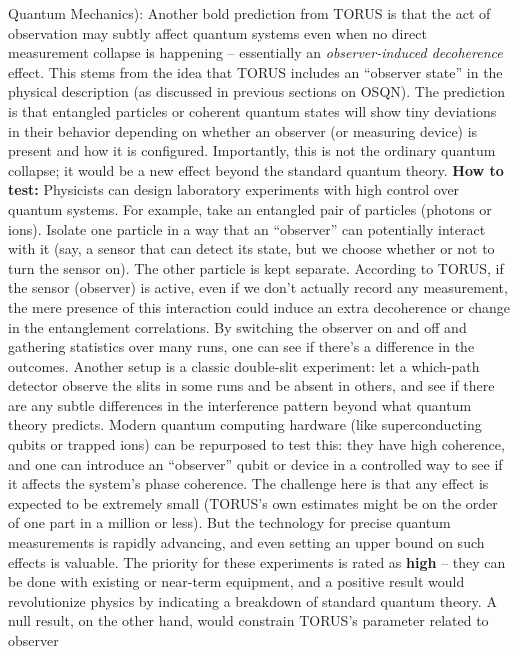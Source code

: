 \begin{itemize}
{  Quantum Mechanics):} Another bold prediction from TORUS is that the
  act of observation may subtly affect quantum systems even when no
  direct measurement collapse is happening -- essentially an
  \emph{observer-induced decoherence} effect. This stems from the idea
  that TORUS includes an ``observer state'' in the physical description
  (as discussed in previous sections on OSQN). The prediction is that
  entangled particles or coherent quantum states will show tiny
  deviations in their behavior depending on whether an observer (or
  measuring device) is present and how it is configured​. Importantly,
  this is not the ordinary quantum collapse; it would be a new effect
  beyond the standard quantum theory. \textbf{How to test:} Physicists
  can design laboratory experiments with high control over quantum
  systems. For example, take an entangled pair of particles (photons or
  ions). Isolate one particle in a way that an ``observer'' can
  potentially interact with it (say, a sensor that can detect its state,
  but we choose whether or not to turn the sensor on). The other
  particle is kept separate. According to TORUS, if the sensor
  (observer) is active, even if we don't actually record any
  measurement, the mere presence of this interaction could induce an
  extra decoherence or change in the entanglement correlations. By
  switching the observer on and off and gathering statistics over many
  runs, one can see if there's a difference in the outcomes​. Another
  setup is a classic double-slit experiment: let a which-path detector
  observe the slits in some runs and be absent in others, and see if
  there are any subtle differences in the interference pattern beyond
  what quantum theory predicts. Modern quantum computing hardware (like
  superconducting qubits or trapped ions) can be repurposed to test
  this: they have high coherence, and one can introduce an ``observer''
  qubit or device in a controlled way to see if it affects the system's
  phase coherence​. The challenge here is that any effect is expected to
  be extremely small (TORUS's own estimates might be on the order of one
  part in a million or less​). But the technology for precise quantum
  measurements is rapidly advancing, and even setting an upper bound on
  such effects is valuable. The priority for these experiments is rated
  as \textbf{high} -- they can be done with existing or near-term
  equipment, and a positive result would revolutionize physics by
  indicating a breakdown of standard quantum theory. A null result, on
  the other hand, would constrain TORUS's parameter related to observer

\end{itemize}
